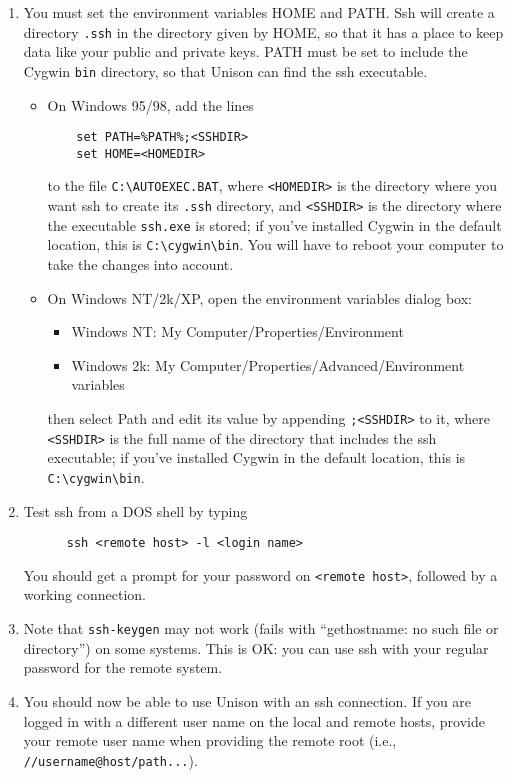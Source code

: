 \documentclass{article}
\begin{document}
\begin{enumerate}
\item You must set the environment variables HOME and PATH\@.
  Ssh will create a directory \verb|.ssh| in the directory given
  by HOME, so that it has a place to keep data like your public and
  private keys.  PATH must be set to include the Cygwin \verb|bin|
  directory, so that Unison can find the ssh executable.
  \begin{itemize}
  \item 
    On Windows 95/98, add the lines
\begin{verbatim}
    set PATH=%PATH%;<SSHDIR>
    set HOME=<HOMEDIR>
\end{verbatim}
    to the file \verb|C:\AUTOEXEC.BAT|, where \verb|<HOMEDIR>| is the
    directory where you want ssh to create its \verb|.ssh| directory,
    and \verb|<SSHDIR>| is the directory where the executable
    \verb|ssh.exe| is stored; if you've installed Cygwin in the
    default location, this is \verb|C:\cygwin\bin|.  You will have to
    reboot your computer to take the changes into account.
  \item On Windows NT/2k/XP, open the environment variables dialog box:
    \begin{itemize}
    \item Windows NT: My Computer/Properties/Environment
    \item Windows 2k: My Computer/Properties/Advanced/Environment
      variables
    \end{itemize}
    then select Path and edit its value by appending \verb|;<SSHDIR>|
    to it, where \verb|<SSHDIR>| is the full name of the directory 
    that includes the ssh executable; if you've installed Cygwin in
    the default location, this is \verb|C:\cygwin\bin|.
  \end{itemize}
  \item Test ssh from a DOS shell by typing
\begin{verbatim}
      ssh <remote host> -l <login name>
\end{verbatim}
    You should get a prompt for your password on \verb|<remote host>|,
    followed by a working connection.
  \item Note that \verb|ssh-keygen| may not work (fails with
  ``gethostname: no such file or directory'') on some systems.  This is
  OK: you can use ssh with your regular password for the remote
  system. 
\item You should now be able to use Unison with an ssh connection. If
  you are logged in with a different user name on the local and remote
  hosts, provide your remote user name when providing the remote root
  (i.e., \verb|//username@host/path...|).
\end{enumerate}
\end{document}
